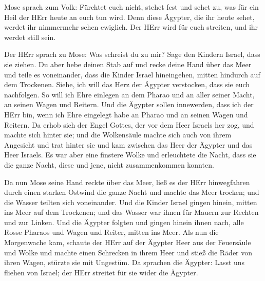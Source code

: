  Mose sprach zum Volk: Fürchtet euch nicht, stehet fest und
sehet zu, was für ein Heil der HErr heute an euch tun wird. Denn diese
Ägypter, die ihr heute sehet, werdet ihr nimmermehr sehen ewiglich.
 Der HErr wird für euch streiten, und ihr werdet still
sein.

 Der HErr sprach zu Mose: Was schreist du zu mir? Sage den
Kindern Israel, dass sie ziehen.  Du aber hebe deinen Stab
auf und recke deine Hand über das Meer und teile es voneinander, dass
die Kinder Israel hineingehen, mitten hindurch auf dem Trockenen.
 Siehe, ich will das Herz der Ägypter verstocken, dass sie
euch nachfolgen. So will ich Ehre einlegen an dem Pharao und an aller
seiner Macht, an seinen Wagen und Reitern.  Und die Ägypter
sollen innewerden, dass ich der HErr bin, wenn ich Ehre eingelegt habe
an Pharao und an seinen Wagen und Reitern.  Da erhob sich
der Engel Gottes, der vor dem Heer Israels her zog, und machte sich
hinter sie; und die Wolkensäule machte sich auch von ihrem Angesicht und
trat hinter sie  und kam zwischen das Heer der Ägypter und
das Heer Israels. Es war aber eine finstere Wolke und erleuchtete die
Nacht, dass sie die ganze Nacht, diese und jene, nicht zusammenkommen
konnten.

 Da nun Mose seine Hand reckte über das Meer, ließ es der
HErr hinwegfahren durch einen starken Ostwind die ganze Nacht und machte
das Meer trocken; und die Wasser teilten sich voneinander. 
Und die Kinder Israel gingen hinein, mitten ins Meer auf dem Trockenen;
und das Wasser war ihnen für Mauern zur Rechten und zur Linken.
 Und die Ägypter folgten und gingen hinein ihnen nach, alle
Rosse Pharaos und Wagen und Reiter, mitten ins Meer.  Als
nun die Morgenwache kam, schaute der HErr auf der Ägypter Heer aus der
Feuersäule und Wolke und machte einen Schrecken in ihrem Heer
 und stieß die Räder von ihren Wagen, stürzte sie mit
Ungestüm. Da sprachen die Ägypter: Lasst uns fliehen von Israel; der
HErr streitet für sie wider die Ägypter.

